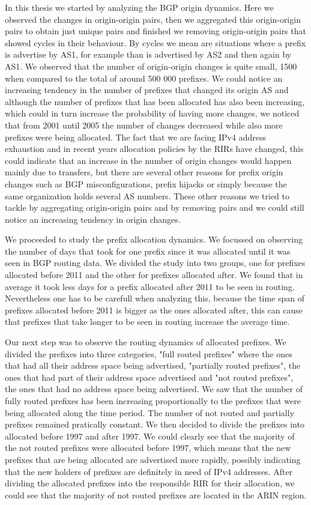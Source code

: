 \documentclass[11pt,a4paper]{scrreprt}
\begin{document}
In this thesis we started by analyzing the BGP origin dynamics. Here we observed the changes in origin-origin pairs, then we aggregated this origin-origin pairs to obtain just unique pairs and finished we removing origin-origin pairs that showed cycles in their behaviour. By cycles we mean are situations where a prefix is advertise by AS1, for example than is advertised by AS2 and then again by AS1. We observed that the number of origin-origin changes is quite small, 1500 when compared to the total of around 500 000 prefixes. We could notice an increasing tendency in the number of prefixes that changed its origin AS and although the number of prefixes that has been allocated has also been increasing, which could in turn increase the probability of having more changes, we noticed that from 2001 until 2005 the number of changes decreased while also more prefixes were being allocated. The fact that we are facing IPv4 address exhaustion and in recent years allocation policies by the RIRs have changed, this could indicate that an increase in the number of origin changes would happen mainly due to transfers, but there are several other reasons for prefix origin changes such as BGP misconfigurations, prefix hijacks or simply because the same organization holds several AS numbers. These other reasons we tried to tackle by aggregating origin-origin pairs and by removing pairs and we could still notice an increasing tendency in origin changes.

We proceeded to study the prefix allocation dynamics. We focussed on observing the number of days that took for one prefix since it was allocated until it was seen in BGP routing data. We divided the study into two groups, one for prefixes allocated before 2011 and the other for prefixes allocated after. We found that in average it took less days for a prefix allocated after 2011 to be seen in routing. Nevertheless one has to be carefull when analyzing this, because the time span of prefixes allocated before 2011 is bigger as the ones allocated after, this can cause that prefixes that take longer to be seen in routing increase the average time.

Our next step was to observe the routing dynamics of allocated prefixes. We divided the prefixes into three categories, "full routed prefixes" where the ones that had all their address space being advertised, "partially routed prefixes", the ones that had part of their address space advertised and "not routed prefixes", the ones that had no address space being advertised. We saw that the number of fully routed prefixes has been increasing proportionally to the prefixes that were being allocated along the time period. The number of not routed and partially prefixes remained pratically constant. We then decided to divide the prefixes into allocated before 1997 and after 1997. We could clearly see that the majority of the not routed prefixes were allocated before 1997, which means that the new prefixes that are being allocated are advertised more rapidly, possibly indicating that the new holders of prefixes are definitely in need of IPv4 addresses. After dividing the allocated prefixes into the responsible RIR for their allocation, we could see that the majority of not routed prefixes are located in the ARIN region.
\end{document}

